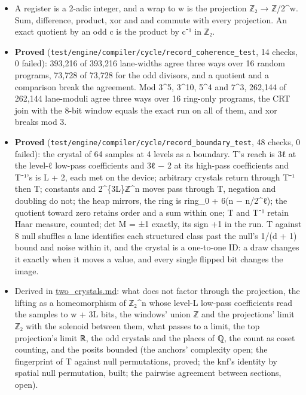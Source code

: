 \begin{itemize}
\begin{itemize}
\item A register is a 2-adic integer, and a wrap to w is the projection ℤ₂ → ℤ/2\textasciicircum{}w. Sum, difference, product, xor and and commute with every projection. An exact quotient by an odd c is the product by c⁻¹ in ℤ₂.
\item \textbf{Proved} (\texttt{test/\allowbreak{}engine/\allowbreak{}compiler/\allowbreak{}cycle/\allowbreak{}record\_\allowbreak{}coherence\_\allowbreak{}test}, 14 checks, 0 failed): 393,216 of 393,216 lane-widths agree three ways over 16 random programs, 73,728 of 73,728 for the odd divisors, and a quotient and a comparison break the agreement. Mod 3\textasciicircum{}5, 3\textasciicircum{}10, 5\textasciicircum{}4 and 7\textasciicircum{}3, 262,144 of 262,144 lane-moduli agree three ways over 16 ring-only programs, the CRT join with the 8-bit window equals the exact run on all of them, and xor breaks mod 3.
\item \textbf{Proved} (\texttt{test/\allowbreak{}engine/\allowbreak{}compiler/\allowbreak{}cycle/\allowbreak{}record\_\allowbreak{}boundary\_\allowbreak{}test}, 48 checks, 0 failed): the crystal of 64 samples at 4 levels as a boundary. T's reach is 3ℓ at the level-ℓ low-pass coefficients and 3ℓ − 2 at its high-pass coefficients and T⁻¹'s is L + 2, each met on the device; arbitrary crystals return through T⁻¹ then T; constants and 2\textasciicircum{}\{3L\}ℤ\textasciicircum{}n moves pass through T, negation and doubling do not; the heap mirrors, the ring is ring\_\allowbreak{}0 + 6(n − n/2\textasciicircum{}ℓ); the quotient toward zero retains order and a sum within one; T and T⁻¹ retain Haar measure, counted; det M = ±1 exactly, its sign +1 in the run. T against 8 null shuffles a lane identifies each structured class past the null's 1/(d + 1) bound and noise within it, and the crystal is a one-to-one ID: a draw changes it exactly when it moves a value, and every single flipped bit changes the image.
\item Derived in \hyperref[chap:two-crystals]{two\_\allowbreak{}crystals.md}: what does not factor through the projection, the lifting as a homeomorphism of ℤ₂\textasciicircum{}n whose level-L low-pass coefficients read the samples to w + 3L bits, the windows' union ℤ and the projections' limit ℤ₂ with the solenoid between them, what passes to a limit, the top projection's limit ℝ, the odd crystals and the places of ℚ, the count as coset counting, and the posits bounded (the anchors' complexity open; the fingerprint of T against null permutations, proved; the knf's identity by spatial null permutation, built; the pairwise agreement between sections, open).

\end{itemize}
\end{itemize}
